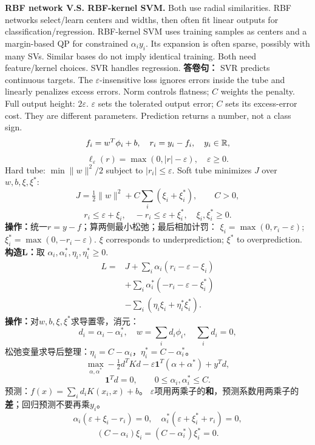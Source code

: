 \textbf{RBF network V.S. RBF-kernel SVM.} Both use radial similarities. RBF networks select/learn centers and widths, then often fit linear outputs for classification/regression. RBF-kernel SVM uses training samples as centers and a margin-based QP for constrained $\alpha_i y_i$. Its expansion is often sparse, possibly with many SVs. Similar bases do not imply identical training. Both need feature/kernel choices. SVR handles regression.
\columnend\sepcol
\columnstart
{}
\textbf{答卷句：} SVR predicts continuous targets. The $\varepsilon$-insensitive loss ignores errors inside the tube and linearly penalizes excess errors. Norm controls flatness; $C$ weights the penalty. Full output height: $2\varepsilon$.
$\varepsilon$ sets the tolerated output error; $C$ sets its excess-error cost. They are different parameters. Prediction returns a number, not a class sign.
\[f_i=w^T\phi_i+b,\quad r_i=y_i-f_i,\quad y_i\in\mathbb{R},\]
\[\ell_\varepsilon(r)=\max(0,|r|-\varepsilon),\quad\varepsilon\ge0.\]
Hard tube: $\min\|w\|^2/2$ subject to $|r_i|\le\varepsilon$. Soft tube minimizes $J$ over $w,b,\xi,\xi^*$:
\[J=\tfrac12\|w\|^2+C\sum_i(\xi_i+\xi_i^*),\qquad C>0,\]
\[r_i\le\varepsilon+\xi_i,\quad-r_i\le\varepsilon+\xi_i^*,\quad\xi_i,\xi_i^*\ge0.\]
\textbf{操作：}统一$r=y-f$；算两侧最小松弛；最后相加计罚：
$\xi_i=\max(0,r_i-\varepsilon)$;
$\xi_i^*=\max(0,-r_i-\varepsilon)$.
$\xi$ corresponds to underprediction; $\xi^*$ to overprediction.
\textbf{构造L：}取 $\alpha_i,\alpha_i^*,\eta_i,\eta_i^*\ge0$.
\[\begin{aligned}
L={}&J+\sum_i\alpha_i(r_i-\varepsilon-\xi_i)\\
&+\sum_i\alpha_i^*(-r_i-\varepsilon-\xi_i^*)\\
&-\sum_i(\eta_i\xi_i+\eta_i^*\xi_i^*).
\end{aligned}\]
\textbf{操作：}对$w,b,\xi,\xi^*$求导置零，消元：
\[d_i=\alpha_i-\alpha_i^*,\quad w=\sum_i d_i\phi_i,\quad\sum_i d_i=0,\]
松弛变量求导后整理：$\eta_i=C-\alpha_i$，$\eta_i^*=C-\alpha_i^*$。
\[\max_{\alpha,\alpha^*}-\tfrac12d^TKd
-\varepsilon\mathbf1^T(\alpha+\alpha^*)+y^Td,\]
\[\mathbf1^Td=0,\qquad0\le\alpha_i,\alpha_i^*\le C.\]
预测：$f(x)=\sum_i d_iK(x_i,x)+b$。
$\varepsilon$项用两乘子的\textbf{和}，预测系数用两乘子的\textbf{差}；回归预测不要再乘$y_i$。
\[\alpha_i(\varepsilon+\xi_i-r_i)=0,\quad
\alpha_i^*(\varepsilon+\xi_i^*+r_i)=0,\]
\[(C-\alpha_i)\xi_i=(C-\alpha_i^*)\xi_i^*=0.\]
